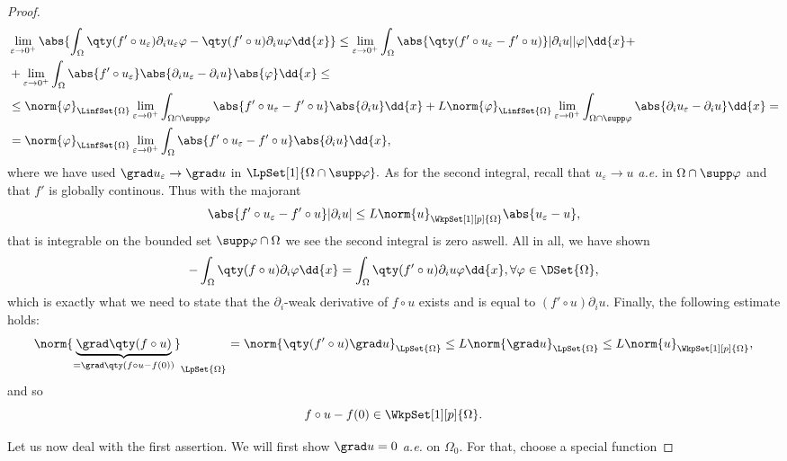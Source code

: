 \begin{proof}
\begin{align*}
	&\lim_{\varepsilon \to 0^+}\abs{\int_{\Omega}\qty(f' \circ u_{\varepsilon})\partial_{i}u_{\varepsilon}\varphi - \qty(f' \circ u)\partial_{i}u \varphi\dd{x}} \leq \lim_{\varepsilon \to 0^{+}}\int_{\Omega}\abs{\qty(f' \circ u_{\varepsilon} - f' \circ u)}|\partial_{i}u| |\varphi|\dd{x} + \\
	&+\lim_{\varepsilon \to 0^{+}}\int_{\Omega}\abs{f' \circ u_{\varepsilon}}\abs{\partial_{i}u_{\varepsilon} - \partial_{i}u}\abs{\varphi}\dd{x}\leq  \\
																				    &\leq \norm{\varphi}_{\LinfSet{\Omega}}\lim_{\varepsilon \to 0^{+}}\int_{\Omega \cap \supp \varphi}\abs{f' \circ u_{\varepsilon} -f' \circ u}\abs{\partial_{i}u}\dd{x} + L \norm{\varphi}_{\LinfSet{\Omega}} \lim_{\varepsilon \to 0^+} \int_{\Omega \cap \supp \varphi}\abs{\partial_{i}u_{\varepsilon} - \partial_{i}u}\dd{x} = \\
																				    & = \norm{\varphi}_{\LinfSet{\Omega}}\lim_{\varepsilon \to 0^+} \int_{\Omega}\abs{f' \circ u_{\varepsilon} - f' \circ u}\abs{\partial_{i}u}\dd{x},
\end{align*}
where we have used $\grad u_{\varepsilon} \to \grad u$ in $\LpSet[1]{\Omega \cap \supp \varphi}.$ As for the second integral, recall that $u_{\varepsilon} \to u $ \textit{a.e.} in $\Omega \cap \supp \varphi $ and that $f'$ is globally continous. Thus with the majorant
\[
	\abs{f' \circ u_{\varepsilon}- f' \circ u}|\partial_{i} u| \leq L \norm{u}_{\WkpSet[1][p]{\Omega}} \abs{u_{\varepsilon} - u},
\]
that is integrable on the bounded set $\supp \varphi \cap \Omega$ we see the second integral is zero aswell. All in all, we have shown
\[
	- \int_{\Omega}\qty(f \circ u)\partial_{i}\varphi\dd{x} = \int_{\Omega}\qty(f' \circ u)\partial_{i}u \varphi\dd{x}, \forall \varphi \in \DSet{\Omega},
\]
which is exactly what we need to state that the $\partial_{i}$-weak derivative of $f \circ u$ exists and is equal to $(f' \circ u) \partial_{i}u$. Finally, the following estimate holds:
\[
	\norm{\underbrace{\grad\qty(f \circ u)}_{= \grad\qty(f \circ u - f(0))}}_{\LpSet{\Omega}} = \norm{\qty(f' \circ u)\grad u}_{\LpSet{\Omega}} \leq L \norm{\grad u}_{\LpSet{\Omega}} \leq L \norm{u}_{\WkpSet[1][p]{\Omega}},
\]
and so
\[
	f\circ u - f(0) \in \WkpSet[1][p]{\Omega}.
\]

Let us now deal with the first assertion. We will first show $\grad u = 0$ \textit{a.e.} on $\Omega_0$. For that, choose a special function


\end{proof}

